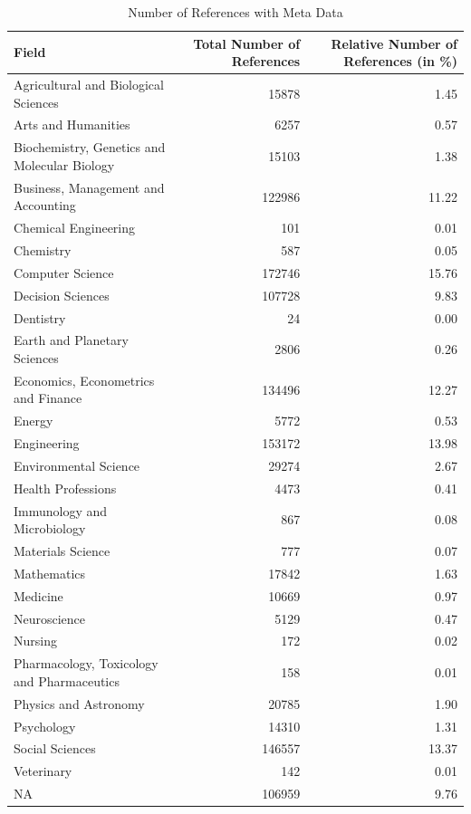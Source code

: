 \documentclass[
]{article}
\begin{document}
\begin{table}[!h]

\caption{\label{tab:internal coverage}Number of References with Meta Data}
\centering
\begin{tabular}[t]{>{\raggedright\arraybackslash}p{5cm}rr}
\toprule
Field & Total Number of References & Relative Number of References (in \%)\\
\midrule
Agricultural and Biological Sciences & 15878 & 1.45\\
Arts and Humanities & 6257 & 0.57\\
Biochemistry, Genetics and Molecular Biology & 15103 & 1.38\\
Business, Management and Accounting & 122986 & 11.22\\
Chemical Engineering & 101 & 0.01\\
Chemistry & 587 & 0.05\\
Computer Science & 172746 & 15.76\\
Decision Sciences & 107728 & 9.83\\
Dentistry & 24 & 0.00\\
Earth and Planetary Sciences & 2806 & 0.26\\
Economics, Econometrics and Finance & 134496 & 12.27\\
Energy & 5772 & 0.53\\
Engineering & 153172 & 13.98\\
Environmental Science & 29274 & 2.67\\
Health Professions & 4473 & 0.41\\
Immunology and Microbiology & 867 & 0.08\\
Materials Science & 777 & 0.07\\
Mathematics & 17842 & 1.63\\
Medicine & 10669 & 0.97\\
Neuroscience & 5129 & 0.47\\
Nursing & 172 & 0.02\\
Pharmacology, Toxicology and Pharmaceutics & 158 & 0.01\\
Physics and Astronomy & 20785 & 1.90\\
Psychology & 14310 & 1.31\\
Social Sciences & 146557 & 13.37\\
Veterinary & 142 & 0.01\\
NA & 106959 & 9.76\\
\bottomrule
\end{tabular}
\end{table}
\end{document}
